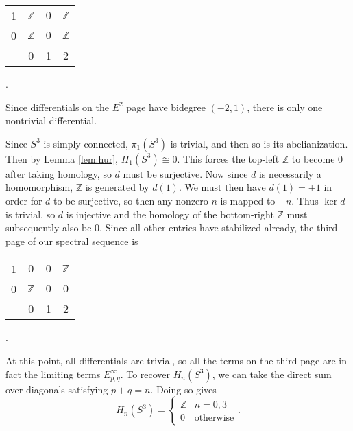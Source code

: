 \documentclass[twoside,10pt]{article}
\begin{document}
\begin{ex}
\begin{center}
		\begin{tabular}{ c | c c c }
			1 & $\mathbb{Z}$ & $0$ &$\mathbb{Z}$\\
			0 & $\mathbb{Z}$ & $0$ &$\mathbb{Z}$\\
			\hline
			  & 0 & 1 & 2
		\end{tabular}.
	\end{center}
	Since differentials on the $E^{2}$ page have bidegree $(-2,1)$, there is only one nontrivial differential.
	\begin{center}
	\end{center}
	Since $S^{3}$ is simply connected, $\pi_1(S^{3})$ is trivial, and then so is its abelianization. Then by Lemma \ref{lem:hur}, $H_{1}(S^{3}) \cong 0$. This forces the top-left $\mathbb{Z}$ to become 0 after taking homology, so $d$ must be surjective. Now since $d$ is necessarily a homomorphism, $\mathbb{Z}$ is generated by $d(1)$. We must then have $d(1) = \pm 1$ in order for $d$ to be surjective, so then any nonzero $n$ is mapped to $\pm n$. Thus $\ker d$ is trivial, so $d$ is injective and the homology of the bottom-right $\mathbb{Z}$ must subsequently also be 0. Since all other entries have stabilized already, the third page of our spectral sequence is
	\begin{center}
                \begin{tabular}{ c | c c c }
                        1 & $0$ & $0$ &$\mathbb{Z}$\\
                        0 & $\mathbb{Z}$ & $0$ &$0$\\
                        \hline
                          & 0 & 1 & 2
                \end{tabular}.
        \end{center}
	At this point, all differentials are trivial, so all the terms on the third page are in fact the limiting terms $E_{p,q}^{\infty}$. To recover $H_{n}(S^{3})$, we can take the direct sum over diagonals satisfying $p+q=n$. Doing so gives
	\[
		H_{n}(S^{3}) =
		\begin{cases}
			\mathbb{Z} & n=0,3\\
			0 &\text{otherwise}
		\end{cases}.
	\] 
\end{ex}



\nocite{mccleary}
\nocite{chow}
\nocite{df}
\nocite{weibel}
\nocite{rotman}

\printbibliography
\end{document}
